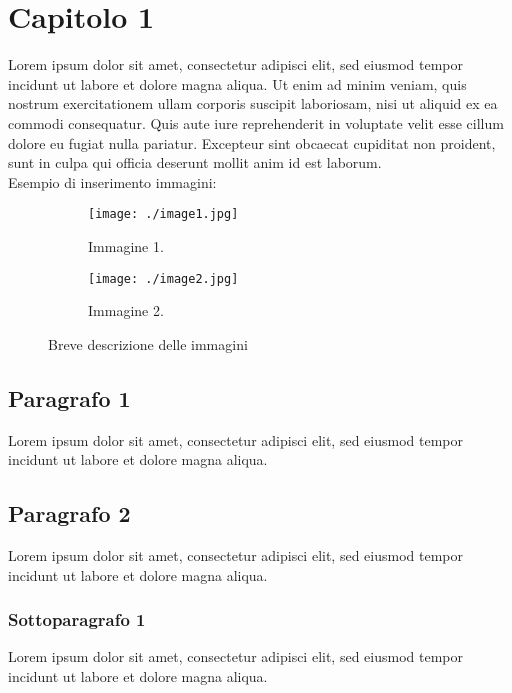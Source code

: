 \chapter{Capitolo 1}\label{Capitolo1}
Lorem ipsum dolor sit amet, consectetur adipisci elit, sed eiusmod tempor incidunt ut labore et dolore magna aliqua. Ut enim ad minim veniam, quis nostrum exercitationem ullam corporis suscipit laboriosam, nisi ut aliquid ex ea commodi consequatur. Quis aute iure reprehenderit in voluptate velit esse cillum dolore eu fugiat nulla pariatur. Excepteur sint obcaecat cupiditat non proident, sunt in culpa qui officia deserunt mollit anim id est laborum.\\

Esempio di inserimento immagini:

\vspace{0.5cm}
\begin{figure}[H]
    \centering
    \begin{subfigure}[b]{0.4\linewidth}
        \texttt{[image: ./image1.jpg]}
        \caption{Immagine 1.}
    \end{subfigure}
    \hspace{1.3cm}
    \begin{subfigure}[b]{0.4\linewidth}
        \texttt{[image: ./image2.jpg]}
        \caption{Immagine 2.}
    \end{subfigure}
    \vspace{.5cm}
    \caption{Breve descrizione delle immagini}
\end{figure}
\vspace{0.5cm}

\newpage

\section{Paragrafo 1}\label{Paragrafo1}
Lorem ipsum dolor sit amet, consectetur adipisci elit, sed eiusmod tempor incidunt ut labore et dolore magna aliqua.

\section{Paragrafo 2}\label{Paragrafo2}
Lorem ipsum dolor sit amet, consectetur adipisci elit, sed eiusmod tempor incidunt ut labore et dolore magna aliqua.

\subsection{Sottoparagrafo 1}\label{Sottoparagrafo 1}
Lorem ipsum dolor sit amet, consectetur adipisci elit, sed eiusmod tempor incidunt ut labore et dolore magna aliqua.

